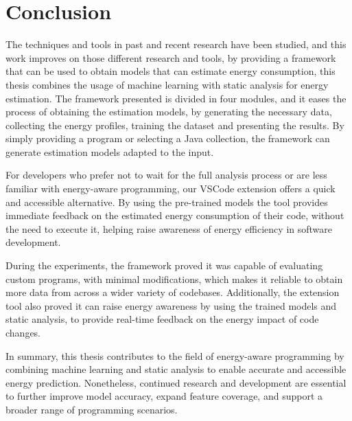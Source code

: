 
\chapter{Conclusion}\label{chapter:conclusion}


The techniques and tools in past and recent research have been studied, and this work improves on those different research and tools, by providing a framework that can be used to obtain models that can estimate energy consumption, this thesis combines the usage of machine learning with static analysis for energy estimation.
The framework presented is divided in four modules, and it eases the process of obtaining the estimation models, by generating the necessary data, collecting the energy profiles, training the dataset and presenting the results. By simply providing a program or selecting a Java collection, the framework can generate estimation models adapted to the input. 

For developers who prefer not to wait for the full analysis process or are less familiar with energy-aware programming, our VSCode extension offers a quick and accessible alternative. By using the pre-trained models the tool provides immediate feedback on the estimated energy consumption of their code, without the need to execute it, helping raise awareness of energy efficiency in software development. 

During the experiments, the framework proved it was capable of evaluating custom programs, with minimal modifications, which makes it reliable to obtain more data from across a wider variety of codebases. Additionally, the extension tool also proved it can raise energy awareness by using the trained models and static analysis, to provide real-time feedback on the energy impact of code changes.

In summary, this thesis contributes to the field of energy-aware programming by combining machine learning and static analysis to enable accurate and accessible energy prediction. Nonetheless, continued research and development are essential to further improve model accuracy, expand feature coverage, and support a broader range of programming scenarios.
